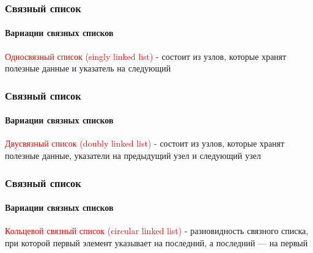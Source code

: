 \documentclass[aspectratio=169]{beamer}
\begin{document}
\begin{frame}
\frametitle{Связный список}
\framesubtitle{Вариации связных списков}
\justifying
\textcolor{red}{Односвязный список (singly linked list)} - состоит из узлов, которые хранят полезные данные и указатель на следующий

\begin{figure}
    \captionsetup[subfigure]{labelformat=empty}
    \centering
\end{figure}
\end{frame}

\begin{frame}
\frametitle{Связный список}
\framesubtitle{Вариации связных списков}
\justifying
\textcolor{red}{Двусвязный список (doubly linked list)} - состоит из узлов, которые хранят полезные данные, указатели на предыдущий узел и следующий узел

\begin{figure}
    \captionsetup[subfigure]{labelformat=empty}
    \centering
\end{figure}
\end{frame}

\begin{frame}
\frametitle{Связный список}
\framesubtitle{Вариации связных списков}
\justifying
\textcolor{red}{Кольцевой связный список (circular linked list)} - разновидность связного списка, при которой первый элемент указывает на последний, а последний — на первый
\begin{figure}
    \captionsetup[subfigure]{labelformat=empty}
    \centering
\end{figure}
\end{frame}
\end{document}
